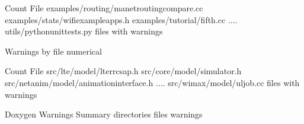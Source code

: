 \documentclass[letterpaper,10pt,english]{sphinxmanual}
\begin{document}
\begin{sphinxVerbatim}[commandchars=\\\{\}]
Count File
\PYGZhy{}\PYGZhy{}\PYGZhy{}\PYGZhy{}\PYGZhy{} \PYGZhy{}\PYGZhy{}\PYGZhy{}\PYGZhy{}\PYGZhy{}\PYGZhy{}\PYGZhy{}\PYGZhy{}\PYGZhy{}\PYGZhy{}\PYGZhy{}\PYGZhy{}\PYGZhy{}\PYGZhy{}\PYGZhy{}\PYGZhy{}\PYGZhy{}\PYGZhy{}\PYGZhy{}\PYGZhy{}\PYGZhy{}\PYGZhy{}\PYGZhy{}\PYGZhy{}\PYGZhy{}\PYGZhy{}\PYGZhy{}\PYGZhy{}\PYGZhy{}\PYGZhy{}\PYGZhy{}\PYGZhy{}\PYGZhy{}\PYGZhy{}
   examples/routing/manet\PYGZhy{}routing\PYGZhy{}compare.cc
   examples/stats/wifi\PYGZhy{}example\PYGZhy{}apps.h
   examples/tutorial/fifth.cc
....
   utils/python\PYGZhy{}unit\PYGZhy{}tests.py
\PYGZhy{}\PYGZhy{}\PYGZhy{}\PYGZhy{}\PYGZhy{}\PYGZhy{}\PYGZhy{}\PYGZhy{}\PYGZhy{}\PYGZhy{}\PYGZhy{}\PYGZhy{}\PYGZhy{}\PYGZhy{}\PYGZhy{}\PYGZhy{}\PYGZhy{}\PYGZhy{}\PYGZhy{}\PYGZhy{}\PYGZhy{}\PYGZhy{}\PYGZhy{}\PYGZhy{}\PYGZhy{}\PYGZhy{}\PYGZhy{}\PYGZhy{}\PYGZhy{}\PYGZhy{}\PYGZhy{}\PYGZhy{}\PYGZhy{}\PYGZhy{}\PYGZhy{}\PYGZhy{}\PYGZhy{}\PYGZhy{}\PYGZhy{}\PYGZhy{}
    files with warnings


Warnings by file numerical

Count File
\PYGZhy{}\PYGZhy{}\PYGZhy{}\PYGZhy{}\PYGZhy{} \PYGZhy{}\PYGZhy{}\PYGZhy{}\PYGZhy{}\PYGZhy{}\PYGZhy{}\PYGZhy{}\PYGZhy{}\PYGZhy{}\PYGZhy{}\PYGZhy{}\PYGZhy{}\PYGZhy{}\PYGZhy{}\PYGZhy{}\PYGZhy{}\PYGZhy{}\PYGZhy{}\PYGZhy{}\PYGZhy{}\PYGZhy{}\PYGZhy{}\PYGZhy{}\PYGZhy{}\PYGZhy{}\PYGZhy{}\PYGZhy{}\PYGZhy{}\PYGZhy{}\PYGZhy{}\PYGZhy{}\PYGZhy{}\PYGZhy{}\PYGZhy{}
  src/lte/model/lte\PYGZhy{}rrc\PYGZhy{}sap.h
  src/core/model/simulator.h
  src/netanim/model/animation\PYGZhy{}interface.h
....
    src/wimax/model/ul\PYGZhy{}job.cc
\PYGZhy{}\PYGZhy{}\PYGZhy{}\PYGZhy{}\PYGZhy{}\PYGZhy{}\PYGZhy{}\PYGZhy{}\PYGZhy{}\PYGZhy{}\PYGZhy{}\PYGZhy{}\PYGZhy{}\PYGZhy{}\PYGZhy{}\PYGZhy{}\PYGZhy{}\PYGZhy{}\PYGZhy{}\PYGZhy{}\PYGZhy{}\PYGZhy{}\PYGZhy{}\PYGZhy{}\PYGZhy{}\PYGZhy{}\PYGZhy{}\PYGZhy{}\PYGZhy{}\PYGZhy{}\PYGZhy{}\PYGZhy{}\PYGZhy{}\PYGZhy{}\PYGZhy{}\PYGZhy{}\PYGZhy{}\PYGZhy{}\PYGZhy{}\PYGZhy{}
    files with warnings


Doxygen Warnings Summary
\PYGZhy{}\PYGZhy{}\PYGZhy{}\PYGZhy{}\PYGZhy{}\PYGZhy{}\PYGZhy{}\PYGZhy{}\PYGZhy{}\PYGZhy{}\PYGZhy{}\PYGZhy{}\PYGZhy{}\PYGZhy{}\PYGZhy{}\PYGZhy{}\PYGZhy{}\PYGZhy{}\PYGZhy{}\PYGZhy{}\PYGZhy{}\PYGZhy{}\PYGZhy{}\PYGZhy{}\PYGZhy{}\PYGZhy{}\PYGZhy{}\PYGZhy{}\PYGZhy{}\PYGZhy{}\PYGZhy{}\PYGZhy{}\PYGZhy{}\PYGZhy{}\PYGZhy{}\PYGZhy{}\PYGZhy{}\PYGZhy{}\PYGZhy{}\PYGZhy{}
    directories
    files
  warnings
\end{sphinxVerbatim}
\end{document}
